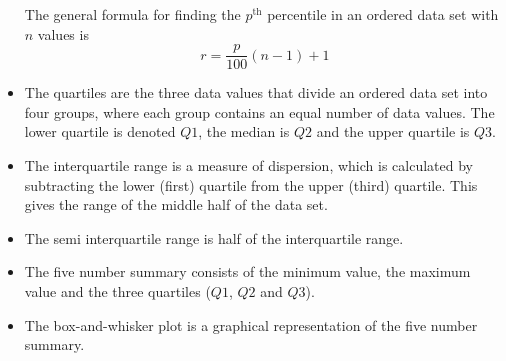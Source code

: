 \begin{itemize}[itemsep=6pt]
The general formula for finding the $p^{\mathrm{th}}$ percentile in an ordered data set with $n$ values is 
\begin{equation*}
  r = \frac{p}{100}\left(n-1\right)+1
\end{equation*}

\item The quartiles are the three data values that divide an ordered data set into four groups, where each group contains an equal number of data values. The lower quartile is denoted $Q1$, the median is $Q2$ and the upper quartile is $Q3$.

\item The interquartile range is a measure of dispersion, which is calculated by subtracting the lower (first) quartile from the upper (third) quartile. This gives the range of the middle half of the data set.

\item The semi interquartile range is half of the interquartile range. 

\item The five number summary consists of the minimum value, the maximum value and the three quartiles ($Q1$, $Q2$ and $Q3$). 

\item The box-and-whisker plot is a graphical representation of the five number summary.
\end{itemize}

